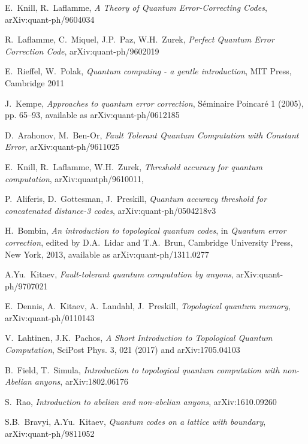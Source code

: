 \documentclass[a4paper, draft]{article}
\theoremstyle{own}
\theoremstyle{remark}
\begin{document}
\begin{thebibliography}{9}
E.~Knill, R.~Laflamme, \emph{A Theory of Quantum Error-Correcting Codes}, arXiv:quant-ph/9604034

R.~Laflamme, C.~Miquel, J.P.~Paz, W.H.~Zurek, \emph{Perfect Quantum Error Correction Code}, 	arXiv:quant-ph/9602019	
	

E.~Rieffel, W.~Polak, \emph{Quantum computing - a gentle introduction},
MIT Press, Cambridge 2011

J.~Kempe, \emph{Approaches to quantum error correction}, S\'eminaire Poincar\'e 1 (2005), pp. 65--93, available as arXiv:quant-ph/0612185

D.~Arahonov, M.~Ben-Or, \emph{Fault Tolerant Quantum Computation with Constant Error},
arXiv:quant-ph/9611025

E.~Knill, R.~Laflamme, W.H.~Zurek, \emph{Threshold accuracy for quantum computation}, arXiv:quantph/9610011,

P.~Aliferis, D.~Gottesman, J.~Preskill, \emph{Quantum accuracy threshold for concatenated distance-3 codes}, arXiv:quant-ph/0504218v3

H.~Bombin, 
\emph{An introduction to topological quantum codes}, in \emph{Quantum error correction}, edited by D.A.~Lidar and T.A.~Brun, Cambridge University Press, New York, 2013, available as arXiv:quant-ph/1311.0277 

A.Yu.~Kitaev, \emph{Fault-tolerant quantum computation by anyons}, 
arXiv:quant-ph/9707021

E.~Dennis, A.~Kitaev, A.~Landahl, J.~Preskill,
\emph{Topological quantum memory}, arXiv:quant-ph/0110143

V.~Lahtinen, J.K.~Pachos,
\emph{A Short Introduction to Topological Quantum Computation}, SciPost Phys. 3, 021 (2017) and arXiv:1705.04103

B.~Field, T.~Simula,
\emph{Introduction to topological quantum computation with non-Abelian anyons},
arXiv:1802.06176

S.~Rao, \emph{Introduction to abelian and non-abelian anyons}, 	arXiv:1610.09260 

S.B.~Bravyi, A.Yu.~Kitaev, 
\emph{Quantum codes on a lattice with boundary}, arXiv:quant-ph/9811052



\end{thebibliography}
\end{document}
